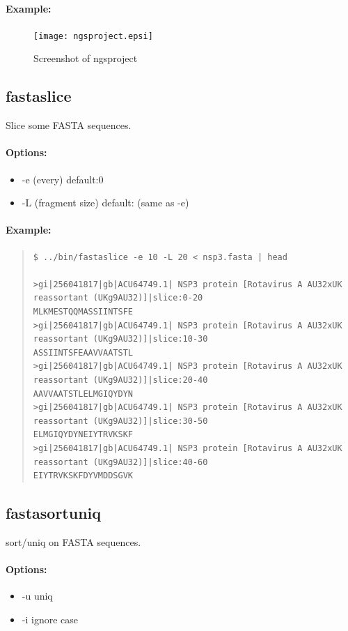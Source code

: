 \documentclass[12pt]{article}
\begin{document}
\paragraph{Example:}
\begin{figure}
\texttt{[image: ngsproject.epsi]}
\caption{Screenshot of ngsproject}
\end{figure}


\subsection{fastaslice}
Slice some FASTA sequences.
\paragraph{Options:}
\begin{itemize}
\item-e (every)  default:0
\item-L (fragment size)  default: (same as -e)
\end{itemize}
\paragraph{Example:}
\begin{quote}
\begin{verbatim}
$ ../bin/fastaslice -e 10 -L 20 < nsp3.fasta | head

>gi|256041817|gb|ACU64749.1| NSP3 protein [Rotavirus A AU32xUK reassortant (UKg9AU32)]|slice:0-20
MLKMESTQQMASSIINTSFE
>gi|256041817|gb|ACU64749.1| NSP3 protein [Rotavirus A AU32xUK reassortant (UKg9AU32)]|slice:10-30
ASSIINTSFEAAVVAATSTL
>gi|256041817|gb|ACU64749.1| NSP3 protein [Rotavirus A AU32xUK reassortant (UKg9AU32)]|slice:20-40
AAVVAATSTLELMGIQYDYN
>gi|256041817|gb|ACU64749.1| NSP3 protein [Rotavirus A AU32xUK reassortant (UKg9AU32)]|slice:30-50
ELMGIQYDYNEIYTRVKSKF
>gi|256041817|gb|ACU64749.1| NSP3 protein [Rotavirus A AU32xUK reassortant (UKg9AU32)]|slice:40-60
EIYTRVKSKFDYVMDDSGVK
\end{verbatim}
\end{quote}


\subsection{fastasortuniq}
sort/uniq on FASTA sequences.
\paragraph{Options:}
\begin{itemize}
\item-u uniq
\item-i ignore case
\end{itemize}
\end{document}
